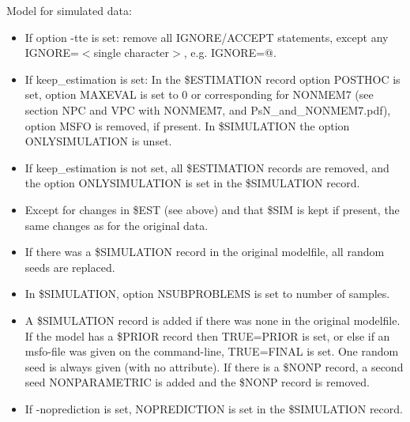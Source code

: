 Model for simulated data:
\begin{itemize}
	\item If option -tte is set: remove all  IGNORE/ACCEPT statements, except any IGNORE=$<$single character$>$, e.g. IGNORE=@.
	\item If keep\_estimation is set: In the \$ESTIMATION record option POSTHOC is set, option MAXEVAL is set to 0 or corresponding for  NONMEM7 (see section NPC and VPC with NONMEM7, and PsN\_and\_NONMEM7.pdf), option MSFO is removed, if present. In \$SIMULATION the option ONLYSIMULATION is unset.
	\item If keep\_estimation is not set, all \$ESTIMATION records are removed, and the option  ONLYSIMULATION is set in the \$SIMULATION record.
	\item Except for changes in \$EST (see above) and that \$SIM is kept if present, the same changes as for the original data.
	\item If there was a \$SIMULATION record in the original modelfile, all random seeds are replaced.      
	\item In \$SIMULATION, option NSUBPROBLEMS is set to number of samples.
	\item A \$SIMULATION record is added if there was none in the original modelfile. If the model has a \$PRIOR record then TRUE=PRIOR is set, or else if an msfo-file was given on the command-line, TRUE=FINAL is set. One random seed is always given (with no attribute). If there is a \$NONP record, a second seed  NONPARAMETRIC is added and the \$NONP record is removed.
	\item If -noprediction is set, NOPREDICTION is set in the \$SIMULATION record. 
\end{itemize}


